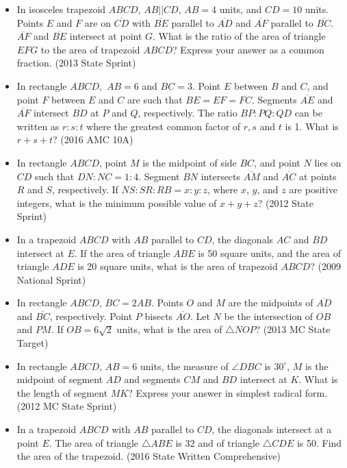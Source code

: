 \documentclass{article}
\begin{document}
\begin{itemize}
\item In isosceles trapezoid $ABCD$, $AB||CD$, $AB=4$ units, and $CD=10$ units. Points $E$ and $F$ are on $\overline{CD}$ with $\overline{BE}$ parallel to $\overline{AD}$ and $\overline{AF}$ parallel to $\overline{BC}$. $\overline{AF}$ and $\overline{BE}$ intersect at point $G$. What is the ratio of the area of triangle $EFG$ to the area of trapezoid $ABCD$? Express your answer as a common fraction. (2013 State Sprint)

\item In rectangle $ABCD,$ $AB=6$ and $BC=3$. Point $E$ between $B$ and $C$, and point $F$ between $E$ and $C$ are such that $BE=EF=FC$. Segments $\overline{AE}$ and $\overline{AF}$ intersect $\overline{BD}$ at $P$ and $Q$, respectively. The ratio $BP:PQ:QD$ can be written as $r:s:t$ where the greatest common factor of $r,s$ and $t$ is 1. What is $r+s+t$? (2016 AMC 10A)

\item In rectangle $ABCD$, point $M$ is the midpoint of side $BC$, and point $N$ lies on $CD$ such that $DN:NC=1:4$. Segment $BN$ intersects $\overline{AM}$ and $\overline{AC}$ at points $R$ and $S$, respectively. If $NS:SR:RB=x:y:z$, where $x$, $y$, and $z$ are positive integers, what is the minimum possible value of $x+y+z$? (2012 State Sprint)

\item In a trapezoid $ABCD$ with $AB$ parallel to $CD$, the diagonals $AC$ and $BD$ intersect at $E$. If the area of triangle $ABE$ is 50 square units, and the area of triangle $ADE$ is 20 square units, what is the area of trapezoid $ABCD$? (2009 National Sprint)

\item In rectangle $ABCD$, $BC=2AB$. Points $O$ and $M$ are the midpoints of $\overline{AD}$ and $\overline{BC}$, respectively. Point $P$ bisects $\overline{AO}$. Let $N$ be the intersection of $OB$ and $PM$. If $OB=6\sqrt{2}$ units, what is the area of $\triangle NOP$? (2013 MC State Target)

\item In rectangle $ABCD$, $AB=6$ units, the measure of $\angle DBC$ is $30^{\circ}$, $M$ is the midpoint of segment $AD$ and segments $CM$ and $BD$ intersect at $K$. What is the length of segment $MK$? Express your answer in simplest radical form. (2012 MC State Sprint)


\item In a trapezoid $ABCD$ with $AB$ parallel to $CD$, the diagonals intersect at a point $E$. The area of triangle $\triangle ABE$ is 32 and of triangle $\triangle CDE$ is 50. Find the area of the trapezoid. (2016 State Written Comprehensive)



\end{itemize}
\end{document}
